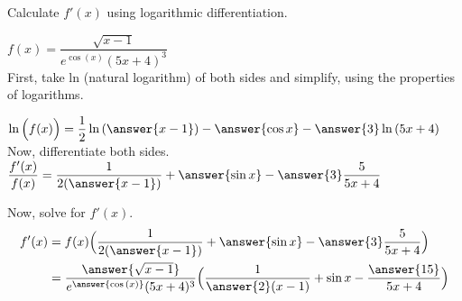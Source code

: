 \documentclass{ximera}
\author{Nela Lakos}
\begin{document}
\begin{exercise}

Calculate $f'(x)$ using logarithmic differentiation. 

 $f(x)=\dfrac{\sqrt{x-1}}{e^{\cos{(x)}}(5x+4)^3}$\\

First, take ln (natural logarithm) of both sides and simplify, using the properties of logarithms.

$\ln{\Bigl(f(x)\Bigr)}=
\dfrac{1}{2}\ln{(\answer{x-1})}-\answer{\cos{x}}-\answer{3}\ln{(5x+4)}$ \\

Now, differentiate both sides.\\

   $ \dfrac{f'(x)}{f(x)} =\dfrac{1}{2(\answer{x-1})}+\answer{\sin{x}}-\answer{3}\dfrac{5}{5x+4}$

Now, solve for $f'(x)$.
\begin{align*}
f'(x)&=f(x)\Bigl(\dfrac{1}{2(\answer{x-1})}+\answer{\sin{x}}-\answer{3}\dfrac{5}{5x+4}\Bigr)\\
&=\dfrac{\answer{\sqrt{x-1}}}{e^{\answer{\cos{(x)}}}(5x+4)^3}\Bigl(\dfrac{1}{\answer{2}(x-1)}+\sin{x}-\dfrac{\answer{15}}{5x+4}\Bigr)
\end{align*}
\end{exercise}
\end{document}
